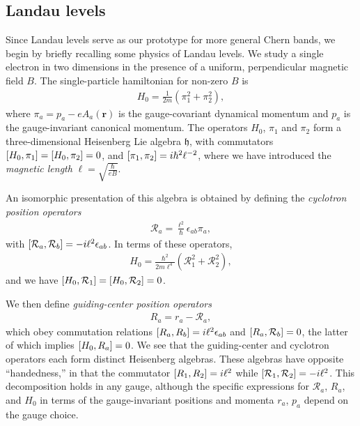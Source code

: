\documentclass[aps,prb,twocolumn,letterpaper,twoside,nobalancelastpage,groupedaddress,amsmath,amssymb,floatfix,citeautoscript]{revtex4-1}
\begin{document}
\subsection{Landau levels}
\label{landau-level-review}
Since Landau levels serve as our prototype for more general Chern bands, we begin by briefly recalling some physics of Landau levels\cite{yoshioka_quantum_2002}. We study a single electron in two dimensions in the presence of a uniform, perpendicular magnetic field $B$. The single-particle hamiltonian for non-zero $B$ is
\begin{align}
\label{landau-hamiltonian}
H_0 = \frac{1}{2m}\left(\pi_1^2 + \pi_2^2\right),
\end{align}
where $\pi_a = p_a - e A_a(\mathbf{r})$ is the gauge-covariant dynamical momentum and $p_a$ is the gauge-invariant canonical momentum. The operators $H_0$, $\pi_1$ and $\pi_2$ form a three-dimensional Heisenberg Lie algebra $\mathfrak{h}$, with commutators $\comm{H_0}{\pi_1} = \comm{H_0}{\pi_2} = 0$, and $\comm{\pi_1}{\pi_2} = i\hbar^2\ell^{-2}$, where we have introduced the \textit{magnetic length} $\ell = \sqrt{\frac{\hbar}{eB}}.$

An isomorphic presentation of this algebra is obtained by defining the \textit{cyclotron position operators}
\begin{align*}
\mathcal{R}_a = \frac{\ell^2}{\hbar}\epsilon_{ab}\pi_a,
\end{align*}
with $\comm{\mathcal{R}_a}{\mathcal{R}_b} = -i\ell^2\epsilon_{ab}$. In terms of these operators, 
\begin{align*}
H_0 = \frac{\hbar^2}{2m\ell^4}\left(\mathcal{R}^2_1 + \mathcal{R}^2_2\right),
\end{align*}
and we have $\comm{H_0}{\mathcal{R}_1} = \comm{H_0}{\mathcal{R}_2} = 0$.

We then define \textit{guiding-center position operators}
\begin{align*}
R_a = r_a - \mathcal{R}_a,
\end{align*}
which obey commutation relations $\comm{R_a}{R_b} = i\ell^2 \epsilon_{ab}$ and $\comm{R_a}{\mathcal{R}_b} = 0$, the latter of which implies $\comm{H_0}{R_a} = 0$. We see that the guiding-center and cyclotron operators each form distinct Heisenberg algebras. These algebras have opposite ``handedness,'' in that the commutator $\comm{R_1}{R_2} = i\ell^2$ while $\comm{\mathcal{R}_1}{\mathcal{R}_2} = -i\ell^2$. This decomposition holds in any gauge, although the specific expressions for $\mathcal{R}_a$, $R_a$, and $H_0$ in terms of the gauge-invariant positions and momenta $r_a$, $p_a$ depend on the gauge choice.
\end{document}
